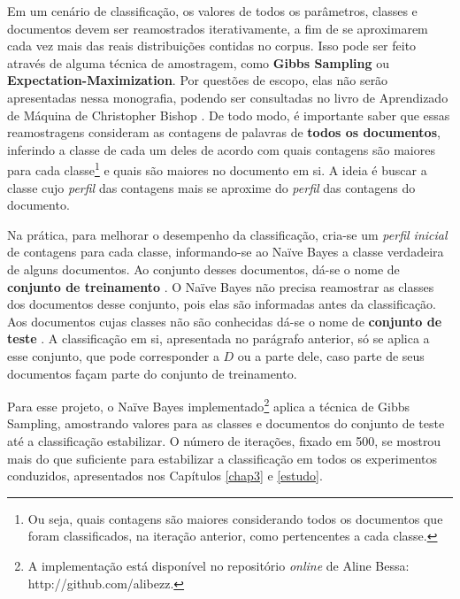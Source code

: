 Em um cenário de classificação, os valores de todos os parâmetros, classes e documentos devem ser reamostrados iterativamente, a fim de se aproximarem cada vez mais das reais distribuições contidas no corpus. Isso pode ser feito através de alguma técnica de amostragem, como \textbf{Gibbs Sampling} ou \textbf{Expectation-Maximization}. Por questões de escopo, elas não serão apresentadas nessa monografia, podendo ser consultadas no livro de Aprendizado de Máquina de Christopher Bishop \cite{bishop}. De todo modo, é importante saber que essas reamostragens consideram as contagens de palavras de \textbf{todos os documentos}, inferindo a classe de cada um deles de acordo com quais contagens são maiores para cada classe\footnote{Ou seja, quais contagens são maiores considerando todos os documentos que foram classificados, na iteração anterior, como pertencentes a cada classe.} e quais são maiores no documento em si. A ideia é buscar a classe cujo \emph{perfil} das contagens mais se aproxime do \emph{perfil} das contagens do documento.

Na prática, para melhorar o desempenho da classificação, cria-se um \emph{perfil inicial} de contagens para cada classe, informando-se ao Naïve Bayes a classe verdadeira de alguns documentos. Ao conjunto desses documentos, dá-se o nome de \textbf{conjunto de treinamento} \cite{bishop}. O Naïve Bayes não precisa reamostrar as classes dos documentos desse conjunto, pois elas são informadas antes da classificação. Aos documentos cujas classes não são conhecidas dá-se o nome de \textbf{conjunto de teste} \cite{bishop}. A classificação em si, apresentada no parágrafo anterior, só se aplica a esse conjunto, que pode corresponder a \ensuremath{D} ou a parte dele, caso parte de seus documentos façam parte do conjunto de treinamento.

Para esse projeto, o Naïve Bayes implementado\footnote{A implementação está disponível no repositório \emph{online} de Aline Bessa: http://github.com/alibezz.} aplica a técnica de Gibbs Sampling, amostrando valores para as classes e documentos do conjunto de teste até a classificação estabilizar. O número de iterações, fixado em 500, se mostrou mais do que suficiente para estabilizar a classificação em todos os experimentos conduzidos, apresentados nos Capítulos \ref{chap3} e \ref{estudo}. 

 
